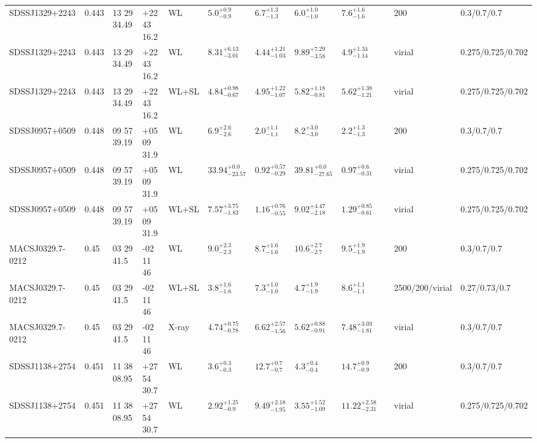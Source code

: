 \begin{landscape}
\begin{center}
{\begin{longtable}{llllllllllll}
SDSSJ1329+2243 & 0.443 & 13 29 34.49 & +22 43 16.2 & WL & ${5.0}^{+0.9}_{-0.9}$ & ${6.7}^{+1.3}_{-1.3}$ & ${6.0}^{+1.0}_{-1.0}$ & ${7.6}^{+1.6}_{-1.6}$ & \citet{SE14.1} & 200 & 0.3/0.7/0.7 \\
SDSSJ1329+2243 & 0.443 & 13 29 34.49 & +22 43 16.2 & WL & ${8.31}^{+6.13}_{-3.01}$ & ${4.44}^{+1.21}_{-1.03}$ & ${9.89}^{+7.29}_{-3.58}$ & ${4.9}^{+1.34}_{-1.14}$ & \citet{OG12.1} & virial & 0.275/0.725/0.702 \\
SDSSJ1329+2243 & 0.443 & 13 29 34.49 & +22 43 16.2 & WL+SL & ${4.84}^{+0.98}_{-0.67}$ & ${4.95}^{+1.22}_{-1.07}$ & ${5.82}^{+1.18}_{-0.81}$ & ${5.62}^{+1.38}_{-1.21}$ & \citet{OG12.1} & virial & 0.275/0.725/0.702 \\
SDSSJ0957+0509 & 0.448 & 09 57 39.19 & +05 09 31.9 & WL & ${6.9}^{+2.6}_{-2.6}$ & ${2.0}^{+1.1}_{-1.1}$ & ${8.2}^{+3.0}_{-3.0}$ & ${2.2}^{+1.3}_{-1.3}$ & \citet{SE14.1} & 200 & 0.3/0.7/0.7 \\
SDSSJ0957+0509 & 0.448 & 09 57 39.19 & +05 09 31.9 & WL & ${33.94}^{+0.0}_{-23.57}$ & ${0.92}^{+0.57}_{-0.29}$ & ${39.81}^{+0.0}_{-27.65}$ & ${0.97}^{+0.6}_{-0.31}$ & \citet{OG12.1} & virial & 0.275/0.725/0.702 \\
SDSSJ0957+0509 & 0.448 & 09 57 39.19 & +05 09 31.9 & WL+SL & ${7.57}^{+3.75}_{-1.83}$ & ${1.16}^{+0.76}_{-0.55}$ & ${9.02}^{+4.47}_{-2.18}$ & ${1.29}^{+0.85}_{-0.61}$ & \citet{OG12.1} & virial & 0.275/0.725/0.702 \\
MACSJ0329.7-0212 & 0.45 & 03 29 41.5 & -02 11 46 & WL & ${9.0}^{+2.3}_{-2.3}$ & ${8.7}^{+1.6}_{-1.6}$ & ${10.6}^{+2.7}_{-2.7}$ & ${9.5}^{+1.9}_{-1.9}$ & \citet{SE14.1} & 200 & 0.3/0.7/0.7 \\
MACSJ0329.7-0212 & 0.45 & 03 29 41.5 & -02 11 46 & WL+SL & ${3.8}^{+1.6}_{-1.6}$ & ${7.3}^{+1.0}_{-1.0}$ & ${4.7}^{+1.9}_{-1.9}$ & ${8.6}^{+1.1}_{-1.1}$ & \citet{ME14.1} & 2500/200/virial & 0.27/0.73/0.7 \\
MACSJ0329.7-0212 & 0.45 & 03 29 41.5 & -02 11 46 & X-ray & ${4.74}^{+0.75}_{-0.78}$ & ${6.62}^{+2.57}_{-1.56}$ & ${5.62}^{+0.88}_{-0.91}$ & ${7.48}^{+3.03}_{-1.81}$ & \citet{SC07.1} & virial & 0.3/0.7/0.7 \\
SDSSJ1138+2754 & 0.451 & 11 38 08.95 & +27 54 30.7 & WL & ${3.6}^{+0.3}_{-0.3}$ & ${12.7}^{+0.7}_{-0.7}$ & ${4.3}^{+0.4}_{-0.4}$ & ${14.7}^{+0.9}_{-0.9}$ & \citet{SE14.1} & 200 & 0.3/0.7/0.7 \\
SDSSJ1138+2754 & 0.451 & 11 38 08.95 & +27 54 30.7 & WL & ${2.92}^{+1.25}_{-0.9}$ & ${9.49}^{+2.18}_{-1.95}$ & ${3.55}^{+1.52}_{-1.09}$ & ${11.22}^{+2.58}_{-2.31}$ & \citet{OG12.1} & virial & 0.275/0.725/0.702 \\

\end{longtable}}
\end{center}
\end{landscape}
